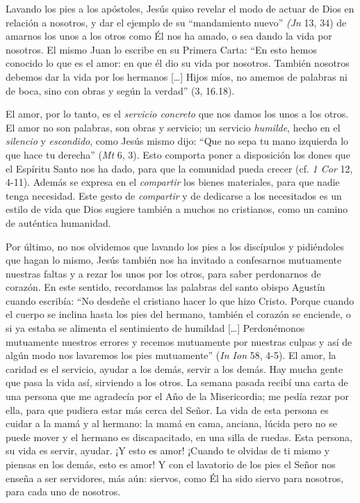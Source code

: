 			\begin{body}Lavando los pies a los apóstoles, Jesús quiso revelar el modo de actuar de Dios en relación a nosotros, y dar el ejemplo de su “mandamiento nuevo” \textit{(Jn}\textbf{ }13, 34) de amarnos los unos a los otros como Él nos ha amado, o sea dando la vida por nosotros. El mismo Juan lo escribe en su Primera Carta: “En esto hemos conocido lo que es el amor: en que él dio su vida por nosotros. También nosotros debemos dar la vida por los hermanos […] Hijos míos, no amemos de palabras ni de boca, sino con obras y según la verdad” (3, 16.18).\end{body}
			
			\begin{body}El amor, por lo tanto, es el \textit{servicio concreto} que nos damos los unos a los otros. El amor no son palabras, son obras y servicio; un servicio \textit{humilde}, hecho en el\textit{ silencio} y \textit{escondido}, como Jesús mismo dijo: “Que no sepa tu mano izquierda lo que hace tu derecha” (\textit{Mt} 6, 3). Esto comporta poner a disposición los dones que el Espíritu Santo nos ha dado, para que la comunidad pueda crecer (cf.\textit{ 1 Cor} 12, 4-11). Además se expresa en el \textit{compartir} los bienes materiales, para que nadie tenga necesidad. Este gesto de\textit{ compartir }y de dedicarse a los necesitados es un estilo de vida que Dios sugiere también a muchos no cristianos, como un camino de auténtica humanidad.\end{body}
			
			\begin{body}Por último, no nos olvidemos que lavando los pies a los discípulos y pidiéndoles que hagan lo mismo, Jesús también nos ha invitado a confesarnos mutuamente nuestras faltas y a rezar los unos por los otros, para saber perdonarnos de corazón. En este sentido, recordamos las palabras del santo obispo Agustín cuando escribía: “No desdeñe el cristiano hacer lo que hizo Cristo. Porque cuando el cuerpo se inclina hasta los pies del hermano, también el corazón se enciende, o si ya estaba se alimenta el sentimiento de humildad […] Perdonémonos mutuamente nuestros errores y recemos mutuamente por nuestras culpas y así de algún modo nos lavaremos los pies mutuamente” (\textit{In Ion }58, 4-5). El amor, la caridad es el servicio, ayudar a los demás, servir a los demás. Hay mucha gente que pasa la vida así, sirviendo a los otros. La semana pasada recibí una carta de una persona que me agradecía por el Año de la Misericordia; me pedía rezar por ella, para que pudiera estar más cerca del Señor. La vida de esta persona es cuidar a la mamá y al hermano: la mamá en cama, anciana, lúcida pero no se puede mover y el hermano es discapacitado, en una silla de ruedas. Esta persona, su vida es servir, ayudar. ¡Y esto es amor! ¡Cuando te olvidas de ti mismo y piensas en los demás, esto es amor! Y con el lavatorio de los pies el Señor nos enseña a ser servidores, más aún: siervos, como Él ha sido siervo para nosotros, para cada uno de nosotros.\end{body}
			
